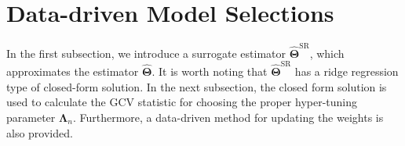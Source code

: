 \documentclass[12pt]{article}
\begin{document}
\section{Data-driven Model Selections} \label{parameter_selection}
In the first subsection, we introduce a surrogate estimator $\widehat{\boldsymbol{\Theta}}^{\text{SR}}$, which approximates the estimator $\widehat{\boldsymbol{\Theta}}$.
It is worth noting that $\widehat{\boldsymbol{\Theta}}^{\text{SR}}$ has a ridge regression type of closed-form solution.
In the next subsection, the closed form solution is used to calculate the GCV statistic for choosing the proper hyper-tuning parameter  $\boldsymbol{\Lambda}_{n}$.
Furthermore, a data-driven method for updating the weights is also provided.
\end{document}
